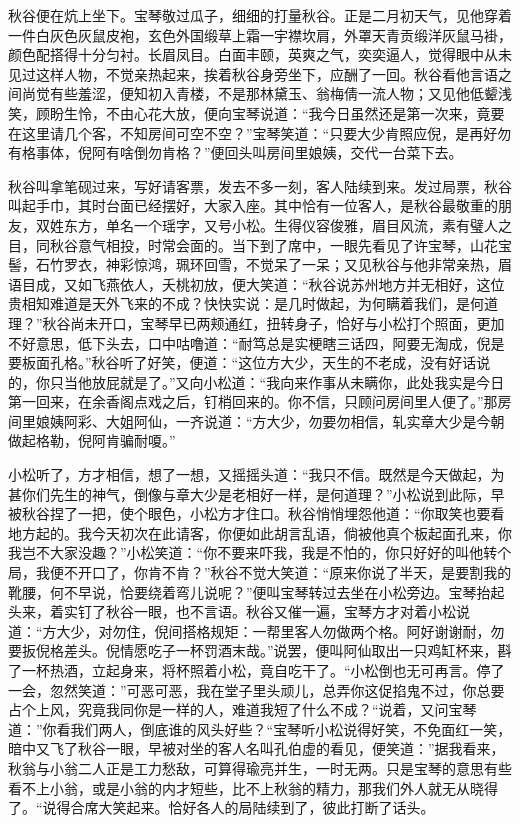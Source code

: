 \documentclass[12pt,UTF8]{ctexbook}
\begin{document}
秋谷便在炕上坐下。宝琴敬过瓜子，细细的打量秋谷。正是二月初天气，见他穿着一件白灰色灰鼠皮袍，玄色外国缎草上霜一宇襟坎肩，外罩天青贡缎洋灰鼠马褂，颜色配搭得十分匀衬。长眉凤目。白面丰颐，英爽之气，奕奕逼人，觉得眼中从未见过这样人物，不觉亲热起来，挨着秋谷身旁坐下，应酬了一回。秋谷看他言语之间尚觉有些羞涩，便知初入青楼，不是那林黛玉、翁梅倩一流人物；又见他低颦浅笑，顾盼生怜，不由心花大放，便向宝琴说道：“我今日虽然还是第一次来，竟要在这里请几个客，不知房间可空不空？”宝琴笑道：“只要大少肯照应倪，是再好勿有格事体，倪阿有啥倒勿肯格？”便回头叫房间里娘姨，交代一台菜下去。

秋谷叫拿笔砚过来，写好请客票，发去不多一刻，客人陆续到来。发过局票，秋谷叫起手巾，其时台面已经摆好，大家入座。其中恰有一位客人，是秋谷最敬重的朋友，双姓东方，单名一个瑶字，又号小松。生得仪容俊雅，眉目风流，素有璧人之目，同秋谷意气相投，时常会面的。当下到了席中，一眼先看见了许宝琴，山花宝髻，石竹罗衣，神彩惊鸿，珮环回雪，不觉呆了一呆；又见秋谷与他非常亲热，眉语目成，又如飞燕依人，夭桃初放，便大笑道：“秋谷说苏州地方并无相好，这位贵相知难道是天外飞来的不成？快快实说：是几时做起，为何瞒着我们，是何道理？”秋谷尚未开口，宝琴早已两颊通红，扭转身子，恰好与小松打个照面，更加不好意思，低下头去，口中咕噜道：“耐笃总是实梗瞎三话四，阿要无淘成，倪是要板面孔格。”秋谷听了好笑，便道：“这位方大少，天生的不老成，没有好话说的，你只当他放屁就是了。”又向小松道：“我向来作事从未瞒你，此处我实是今日第一回来，在余香阁点戏之后，钉梢回来的。你不信，只顾问房间里人便了。”那房间里娘姨阿彩、大姐阿仙，一齐说道：“方大少，勿要勿相信，轧实章大少是今朝做起格勒，倪阿肯骗耐嗄。”

小松听了，方才相信，想了一想，又摇摇头道：“我只不信。既然是今天做起，为甚你们先生的神气，倒像与章大少是老相好一样，是何道理？”小松说到此际，早被秋谷捏了一把，使个眼色，小松方才住口。秋谷悄悄埋怨他道：“你取笑也要看地方起的。我今天初次在此请客，你便如此胡言乱语，倘被他真个板起面孔来，你我岂不大家没趣？”小松笑道：“你不要来吓我，我是不怕的，你只好好的叫他转个局，我便不开口了，你肯不肯？”秋谷不觉大笑道：“原来你说了半天，是要割我的靴腰，何不早说，恰要绕着弯儿说呢？”便叫宝琴转过去坐在小松旁边。宝琴抬起头来，着实钉了秋谷一眼，也不言语。秋谷又催一遍，宝琴方才对着小松说道：“方大少，对勿住，倪间搭格规矩：一帮里客人勿做两个格。阿好谢谢耐，勿要扳倪格差头。倪情愿吃子一杯罚酒末哉。”说罢，便叫阿仙取出一只鸡缸杯来，斟了一杯热酒，立起身来，将杯照着小松，竟自吃干了。“小松倒也无可再言。停了一会，忽然笑道：”可恶可恶，我在堂子里头顽儿，总弄你这促掐鬼不过，你总要占个上风，究竟我同你是一样的人，难道我短了什么不成？“说着，又问宝琴道：”你看我们两人，倒底谁的风头好些？“宝琴听小松说得好笑，不免面红一笑，暗中又飞了秋谷一眼，早被对坐的客人名叫孔伯虚的看见，便笑道：”据我看来，秋翁与小翁二人正是工力愁敌，可算得瑜亮并生，一时无两。只是宝琴的意思有些看不上小翁，或是小翁的内才短些，比不上秋翁的精力，那我们外人就无从晓得了。“说得合席大笑起来。恰好各人的局陆续到了，彼此打断了话头。
\end{document}
